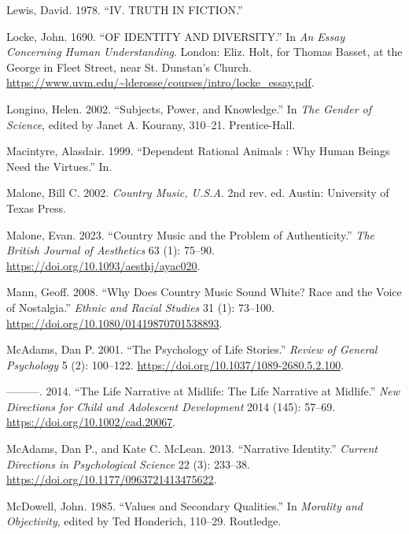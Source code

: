 \documentclass[12pt]{book}
\newenvironment{CSLReferences}%
  {\setlength{\parindent}{0pt}%
   \setlength{\leftskip}{0pt}%
   \setlength{\parskip}{0pt}}%
  {\par}
\theoremstyle{definition}
\theoremstyle{remark}
\begin{document}
\begin{CSLReferences}{1}{0}
Lewis, David. 1978. {``{IV}. {TRUTH IN FICTION}.''}

Locke, John. 1690. {``{OF IDENTITY AND DIVERSITY}.''} In \emph{An {Essay Concerning Human Understanding}}. London: Eliz. Holt, for Thomas Basset, at the George in Fleet Street, near St. Dunstan's Church. \url{https://www.uvm.edu/~lderosse/courses/intro/locke_essay.pdf}.

Longino, Helen. 2002. {``Subjects, {Power}, and {Knowledge}.''} In \emph{The {Gender} of {Science}}, edited by Janet A. Kourany, 310--21. Prentice-Hall.

Macintyre, Alasdair. 1999. {``Dependent Rational Animals : Why Human Beings Need the Virtues.''} In.

Malone, Bill C. 2002. \emph{Country Music, {U}.{S}.{A}}. 2nd rev. ed. Austin: University of Texas Press.

Malone, Evan. 2023. {``Country {Music} and the {Problem} of {Authenticity}.''} \emph{The British Journal of Aesthetics} 63 (1): 75--90. \url{https://doi.org/10.1093/aesthj/ayac020}.

Mann, Geoff. 2008. {``Why Does Country Music Sound White? {Race} and the Voice of Nostalgia.''} \emph{Ethnic and Racial Studies} 31 (1): 73--100. \url{https://doi.org/10.1080/01419870701538893}.

McAdams, Dan P. 2001. {``The {Psychology} of {Life Stories}.''} \emph{Review of General Psychology} 5 (2): 100--122. \url{https://doi.org/10.1037/1089-2680.5.2.100}.

---------. 2014. {``The {Life Narrative} at {Midlife}: {The Life Narrative} at {Midlife}.''} \emph{New Directions for Child and Adolescent Development} 2014 (145): 57--69. \url{https://doi.org/10.1002/cad.20067}.

McAdams, Dan P., and Kate C. McLean. 2013. {``Narrative {Identity}.''} \emph{Current Directions in Psychological Science} 22 (3): 233--38. \url{https://doi.org/10.1177/0963721413475622}.

McDowell, John. 1985. {``Values and {Secondary Qualities}.''} In \emph{Morality and {Objectivity}}, edited by Ted Honderich, 110--29. Routledge.


\end{CSLReferences}
\end{document}
